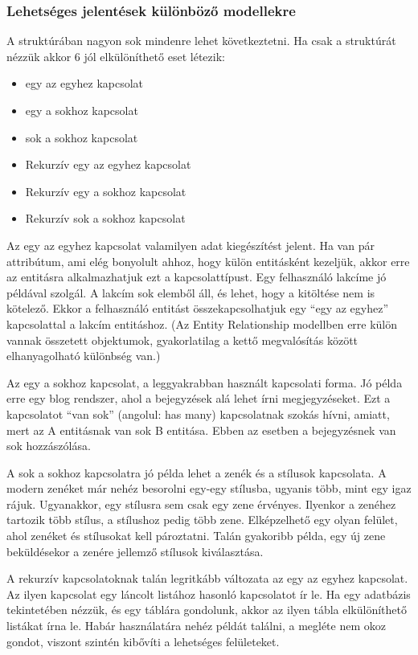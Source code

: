 \documentclass[a4paper,12pt,oneside]{report}
\begin{document}
\subsubsection{Lehetséges jelentések különböző modellekre}
\begin{justify}

	A struktúrában nagyon sok mindenre lehet következtetni. Ha csak a struktúrát nézzük akkor 6 jól elkülöníthető eset létezik:

	\begin{itemize}
		\item egy az egyhez kapcsolat
		\item egy a sokhoz kapcsolat
		\item sok a sokhoz kapcsolat
		\item Rekurzív egy az egyhez kapcsolat
		\item Rekurzív egy a sokhoz kapcsolat
		\item Rekurzív sok a sokhoz kapcsolat
	\end{itemize}

    Az egy az egyhez kapcsolat valamilyen adat kiegészítést jelent. Ha van pár attribútum, ami elég bonyolult ahhoz, hogy külön entitásként kezeljük, akkor erre az entitásra alkalmazhatjuk ezt a kapcsolattípust. Egy felhasználó lakcíme jó példával szolgál. A lakcím sok elemből áll, és lehet, hogy a kitöltése nem is kötelező. Ekkor a felhasználó entitást összekapcsolhatjuk egy “egy az egyhez” kapcsolattal a lakcím entitáshoz. (Az Entity Relationship modellben erre külön vannak összetett objektumok, gyakorlatilag a kettő megvalósítás között elhanyagolható különbség van.)

    Az egy a sokhoz kapcsolat, a leggyakrabban használt kapcsolati forma. Jó példa erre egy blog rendszer, ahol a bejegyzések alá lehet írni megjegyzéseket. Ezt a kapcsolatot “van sok” (angolul: has many) kapcsolatnak szokás hívni, amiatt, mert az A entitásnak van sok B entitása. Ebben az esetben a bejegyzésnek van sok hozzászólása.

    A sok a sokhoz kapcsolatra jó példa lehet a zenék és a stílusok kapcsolata. A modern zenéket már nehéz besorolni egy-egy stílusba, ugyanis több, mint egy igaz rájuk. Ugyanakkor, egy stílusra sem csak egy zene érvényes. Ilyenkor a zenéhez tartozik több stílus, a stílushoz pedig több zene. Elképzelhető egy olyan felület, ahol zenéket és stílusokat kell pároztatni. Talán gyakoribb példa, egy új zene beküldésekor a zenére jellemző stílusok kiválasztása.   

	A rekurzív kapcsolatoknak talán legritkább változata az egy az egyhez kapcsolat. Az ilyen kapcsolat egy láncolt listához hasonló kapcsolatot ír le. Ha egy adatbázis tekintetében nézzük, és egy táblára gondolunk, akkor az ilyen tábla elkülöníthető listákat írna le. Habár használatára nehéz példát találni, a megléte nem okoz gondot, viszont szintén kibővíti a lehetséges felületeket. 


\end{justify}
\end{document}

